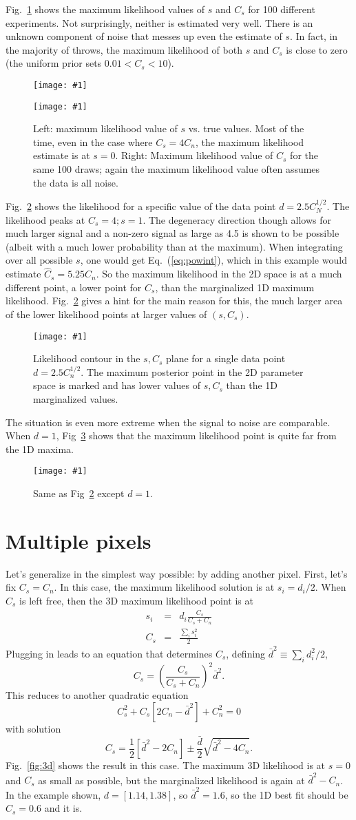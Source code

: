 \documentclass[11pt, oneside]{article}   	%
\def\be{\begin{equation}}
\def\ee{\end{equation}}
\def\bea{\begin{eqnarray}}
\def\eea{\end{eqnarray}}
\newcommand{\vs}{\nonumber\\}
\newcommand{\ec}[1]{Eq.~(\ref{eq:#1})}
\newcommand{\sfig}[2]{
\texttt{[image: \#1]}
        }
\newcommand{\Spng}[2]{
   \begin{figure}[thbp]
   \begin{center}
    \sfig{#1.png}{0.7\columnwidth}
    \caption{{\small #2}}
    \label{fig:#1}
     \end{center}
   \end{figure}
}
\newcommand{\Stwo}[3]{
   \begin{figure}[thbp]
   \begin{center}
    \sfig{#1.png}{0.45\columnwidth}
    \sfig{#2.png}{0.45\columnwidth}
    \caption{{\small #3}}
    \label{fig:#1}
     \end{center}
   \end{figure}
}
\newcommand{\rf}[1]{\ref{fig:#1}}
\begin{document}
Fig.~\rf{ss} shows the maximum likelihood values of $s$ and $C_s$ for 100 different experiments. Not surprisingly, neither is estimated very well. There is an unknown component of noise that messes up even the estimate of $s$. In fact, in the majority of throws, the maximum likelihood of both $s$ and $C_s$ is close to zero (the uniform prior sets $0.01<C_s<10$). 
\Stwo{ss}{cs}{Left: maximum likelihood value of $s$ vs. true values. Most of the time, even in the case where $C_s=4C_n$, the maximum likelihood estimate is at $s=0$. Right: Maximum likelihood value of $C_s$ for the same 100 draws; again the maximum likelihood value often assumes the data is all noise.}

Fig.~\rf{l2.5} shows the likelihood for a specific value of the data point $d=2.5C_N^{1/2}$. The likelihood peaks at $C_s=4;s=1$.  The degeneracy direction though allows for much larger signal and a non-zero signal as large as 4.5 is shown to be possible (albeit with a much lower probability than at the maximum). When integrating over all possible $s$, one would get \ec{powint}, which in this example would estimate $\hat C_s=5.25C_n$. 
So the maximum likelihood in the 2D space is at a much different point, a lower point for $C_s$, than the marginalized 1D maximum likelihood. Fig.~\rf{l2.5} gives a hint for the main reason for this, the much larger area of the lower likelihood points at larger values of $(s,C_s)$.
\Spng{l2.5}{Likelihood contour in the $s,C_s$ plane for a single data point $d=2.5C_n^{1/2}$. The maximum posterior point in the 2D parameter space is marked and has lower values of $s,C_s$ than the 1D marginalized values.}

The situation is even more extreme when the signal to noise are comparable. When $d=1$, Fig~\rf{l1} shows that the maximum likelihood point is quite far from the 1D maxima.
\Spng{l1}{Same as Fig~\rf{l2.5} except $d=1$.}

\section{Multiple pixels}

Let's generalize in the simplest way possible: by adding another pixel. First, let's fix $C_s=C_n$. In this case, the maximum likelihood solution is at $s_i=d_i/2.$ When $C_s$ is left free, then the 3D maximum likelihood point is at 
\bea
s_i &=& d_i \frac{C_s}{C_s+C_n}\vs
C_s &=& \frac{\sum_i s_i^2}{2}
\eea
Plugging in leads to an equation that determines $C_s$, defining $\bar d^2\equiv \sum_i d_i^2/2$,
\be
C_s =  \left(\frac{C_s}{C_s+C_n} \right)^2\bar d^2.\ee
This reduces to another quadratic equation
\be
C_s^2 + C_s\left[ 2C_n - \bar d^2 \right] + C_n^2=0\ee
with solution
\be
C_s = \frac12 \left[ \bar d^2-2C_n\right] \pm \frac{\bar d}2\sqrt{\bar d^2-4C_n}
.\ee
Fig.~\rf{3d} shows the result in this case. The maximum 3D likelihood is at $s=0$ and $C_s$ as small as possible, but the marginalized likelihood is again at $\bar d^2-C_n$. In the example shown, $d=[1.14,1.38]$, so $\bar d^2=1.6$, so the 1D best fit should be $C_s=0.6$ and it is.
\end{document}
